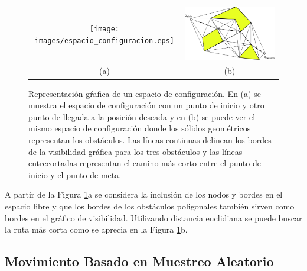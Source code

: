 \begin{figure}%
      \begin{tabular}{cc}
        \texttt{[image: images/espacio\_configuracion.eps]}&
        \includegraphics[width=.49\textwidth]{images/espacio_configuracion2.jpg}\\
        (a)&(b)
    \end{tabular}
  \captionsetup{font=footnotesize}
    \caption{\label{f:mapPolygonal}Representación gŕafica de un espacio de configuración. En (a) 
    se muestra el espacio de configuración con un punto de inicio y otro punto de llegada a la 
    posición deseada y en (b) se puede ver el mismo espacio de configuración donde los sólidos 
    geométricos representan los obstáculos. Las líneas continuas delinean los bordes de la 
    visibilidad gráfica para los tres obstáculos y las líneas entrecortadas representan el camino 
    más corto entre el punto de inicio y el punto de meta.}
\end{figure}


A partir de la Figura \ref{f:mapPolygonal}a se considera la inclusión de 
los nodos y bordes en el espacio libre y que los bordes de los obstáculos 
poligonales también sirven como bordes en el gráfico de 
visibilidad. Utilizando distancia euclidiana se puede buscar la ruta más 
corta como se aprecia en la Figura \ref{f:mapPolygonal}b.

\subsection{Movimiento Basado en Muestreo Aleatorio}

